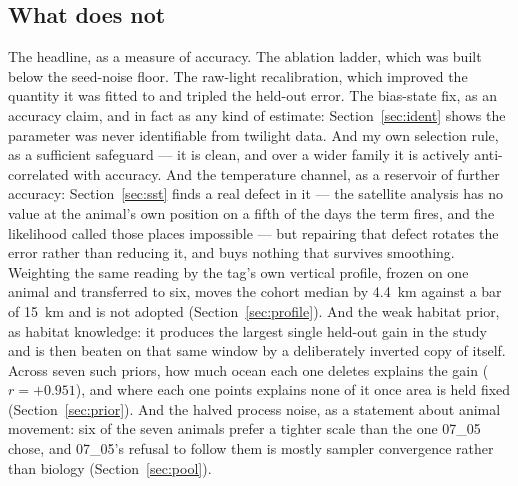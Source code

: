 \documentclass[conference]{IEEEtran}
\begin{document}
\subsection{What does not}
The headline, as a measure of accuracy. The ablation ladder, which was built
below the seed-noise floor. The raw-light recalibration, which improved the
quantity it was fitted to and tripled the held-out error. The bias-state fix, as an accuracy
claim, and in fact as any kind of estimate: Section~\ref{sec:ident} shows the
parameter was never identifiable from twilight data. And my own selection rule, as
a sufficient safeguard --- it is clean, and over a wider family it is actively
anti-correlated with accuracy. And the temperature channel, as a reservoir of further accuracy: Section~\ref{sec:sst} finds a real defect in it --- the satellite analysis has no value at the animal's own position on a fifth of the days the term fires, and the likelihood called those places impossible --- but repairing that defect rotates the error rather than reducing it, and buys nothing that survives smoothing. Weighting the same reading by the tag's own vertical profile, frozen on one animal and transferred to six, moves the cohort median by \SI{4.4}{\km} against a bar of \SI{15}{\km} and is not adopted (Section~\ref{sec:profile}). And the weak habitat prior, as habitat
knowledge: it produces the largest single held-out gain in the study and is then
beaten on that same window by a deliberately inverted copy of itself. Across
seven such priors, how much ocean each one deletes explains the gain
($r=+0.951$), and where each one points explains none of it once area is held
fixed (Section~\ref{sec:prior}). And the halved process noise, as a statement
about animal movement: six of the seven animals prefer a tighter scale than the
one 07\_05 chose, and 07\_05's refusal to follow them is mostly sampler
convergence rather than biology (Section~\ref{sec:pool}).
\end{document}
